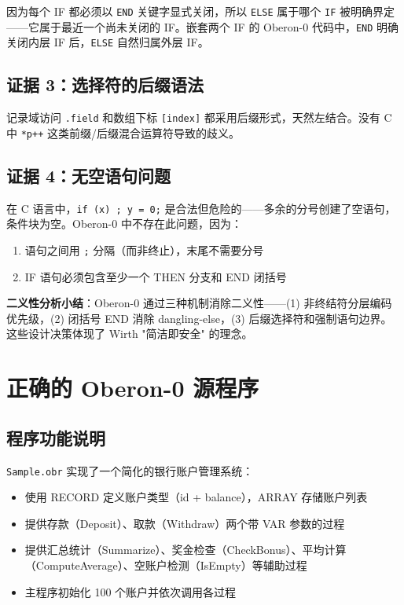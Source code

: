 \documentclass[12pt,a4paper,fontset=none]{ctexart}
\begin{document}
因为每个 IF 都必须以 \texttt{END} 关键字显式关闭，所以 \texttt{ELSE} 属于哪个 \texttt{IF} 被明确界定——它属于最近一个尚未关闭的 IF。嵌套两个 IF 的 Oberon-0 代码中，\texttt{END} 明确关闭内层 IF 后，\texttt{ELSE} 自然归属外层 IF。

\subsection*{证据 3：选择符的后缀语法}

记录域访问 \texttt{.field} 和数组下标 \texttt{[index]} 都采用后缀形式，天然左结合。没有 C 中 \texttt{*p++} 这类前缀/后缀混合运算符导致的歧义。

\subsection*{证据 4：无空语句问题}

\begin{plainBox}
在 C 语言中，\texttt{if (x) ; y = 0;} 是合法但危险的——多余的分号创建了空语句，条件块为空。Oberon-0 中不存在此问题，因为：
\begin{enumerate}
  \item 语句之间用 \texttt{;} 分隔（而非终止），末尾不需要分号
  \item IF 语句必须包含至少一个 THEN 分支和 END 闭括号
\end{enumerate}
\end{plainBox}

\begin{summaryBox}
\textbf{二义性分析小结}：Oberon-0 通过三种机制消除二义性——(1) 非终结符分层编码优先级，(2) 闭括号 END 消除 dangling-else，(3) 后缀选择符和强制语句边界。这些设计决策体现了 Wirth "简洁即安全" 的理念。
\end{summaryBox}

\section{正确的 Oberon-0 源程序}

\subsection{程序功能说明}

\texttt{Sample.obr} 实现了一个简化的银行账户管理系统：

\begin{itemize}
  \item 使用 RECORD 定义账户类型（id + balance），ARRAY 存储账户列表
  \item 提供存款（Deposit）、取款（Withdraw）两个带 VAR 参数的过程
  \item 提供汇总统计（Summarize）、奖金检查（CheckBonus）、平均计算（ComputeAverage）、空账户检测（IsEmpty）等辅助过程
  \item 主程序初始化 100 个账户并依次调用各过程
\end{itemize}
\end{document}
